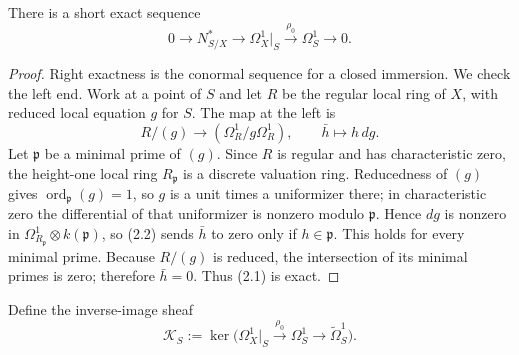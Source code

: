 \begin{lemma}
\label{lem:conormal}
There is a short exact sequence
\[
0\longrightarrow N^*_{S/X}\longrightarrow \Omega^1_X|_S
\xrightarrow{\rho_0}\Omega^1_S\longrightarrow0.
\tag{2.1}
\]
\end{lemma}

\begin{proof}
Right exactness is the conormal sequence for a closed immersion.  We check
the left end.  Work at a point of $S$ and let $R$ be the regular local ring
of $X$, with reduced local equation $g$ for $S$.  The map at the left is
\[
 R/(g)\longrightarrow (\Omega^1_R/g\Omega^1_R),
 \qquad \bar h\longmapsto h\,dg.
 \tag{2.2}
\]
Let $\mathfrak p$ be a minimal prime of $(g)$.  Since $R$ is regular and
has characteristic zero, the height-one local ring $R_{\mathfrak p}$ is a
discrete valuation ring.  Reducedness of $(g)$ gives
$\operatorname{ord}_{\mathfrak p}(g)=1$, so $g$ is a unit times a
uniformizer there; in characteristic zero the differential of that
uniformizer is nonzero modulo $\mathfrak p$.  Hence $dg$ is nonzero in
$\Omega^1_{R_{\mathfrak p}}\otimes k(\mathfrak p)$, so (2.2) sends $\bar h$
to zero only if $h\in\mathfrak p$.  This holds for every minimal prime.
Because $R/(g)$ is reduced, the intersection of its minimal primes is zero;
therefore $\bar h=0$.  Thus (2.1) is exact.
\end{proof}

Define the inverse-image sheaf
\[
 \mathscr K_S:=\ker\bigl(\Omega^1_X|_S\xrightarrow{\rho_0}
 \Omega^1_S\longrightarrow\widetilde\Omega^1_S\bigr).
 \tag{2.3}
\]

